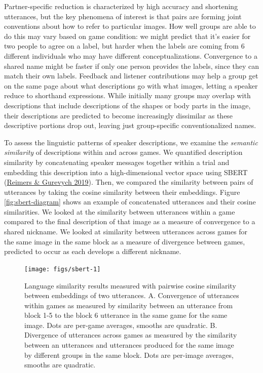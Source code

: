 \documentclass[
  english,
  a4paper,
]{article}
\begin{document}
Partner-specific reduction is characterized by high accuracy and shortening utterances, but the key phenomena of interest is that pairs are forming joint conventions about how to refer to particular images. How well groups are able to do this may vary based on game condition: we might predict that it's easier for two people to agree on a label, but harder when the labels are coming from 6 different individuals who may have different conceptualizations. Convergence to a shared name might be faster if only one person provides the labels, since they can match their own labels. Feedback and listener contributions may help a group get on the same page about what descriptions go with what images, letting a speaker reduce to shorthand expressions. While initially many groups may overlap with descriptions that include descriptions of the shapes or body parts in the image, their descriptions are predicted to become increasingly dissimilar as these descriptive portions drop out, leaving just group-specific conventionalized names.

To assess the linguistic patterns of speaker descriptions, we examine the \emph{semantic similarity} of descriptions within and across games. We quantified description similarity by concatenating speaker messages together within a trial and embedding this description into a high-dimensional vector space using SBERT (\protect\hyperlink{ref-reimers2019}{Reimers \& Gurevych 2019}). Then, we compared the similarity between pairs of utterances by taking the cosine similarity between their embeddings. Figure \ref{fig:sbert-diagram} shows an example of concatenated utterances and their cosine similarities. We looked at the similarity between utterances within a game compared to the final description of that image as a measure of convergence to a shared nickname. We looked at similarity between utterances across games for the same image in the same block as a measure of divergence between games, predicted to occur as each develops a different nickname.

\begin{figure}[t!]

{\centering \texttt{[image: figs/sbert-1]} 

}

\caption{Language similarity results measured with pairwise cosine similarity between embeddings of two utterances. A. Convergence of utterances within games as measured by similarity between an utterance from block 1-5 to the block 6 utterance in the same game for the same image. Dots are per-game averages, smooths are quadratic. B. Divergence of utterances across games as measured by the similarity between an utterances and utterances produced for the same image by different groups in the same block. Dots are per-image averages, smooths are quadratic.}\label{fig:sbert}
\end{figure}
\end{document}
